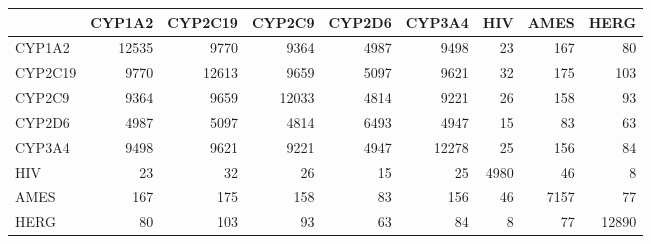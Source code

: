\begin{tabular}{lrrrrrrrr}
\toprule
 & CYP1A2 & CYP2C19 & CYP2C9 & CYP2D6 & CYP3A4 & HIV & AMES & HERG \\
\midrule
CYP1A2 & 12535 & 9770 & 9364 & 4987 & 9498 & 23 & 167 & 80 \\
CYP2C19 & 9770 & 12613 & 9659 & 5097 & 9621 & 32 & 175 & 103 \\
CYP2C9 & 9364 & 9659 & 12033 & 4814 & 9221 & 26 & 158 & 93 \\
CYP2D6 & 4987 & 5097 & 4814 & 6493 & 4947 & 15 & 83 & 63 \\
CYP3A4 & 9498 & 9621 & 9221 & 4947 & 12278 & 25 & 156 & 84 \\
HIV & 23 & 32 & 26 & 15 & 25 & 4980 & 46 & 8 \\
AMES & 167 & 175 & 158 & 83 & 156 & 46 & 7157 & 77 \\
HERG & 80 & 103 & 93 & 63 & 84 & 8 & 77 & 12890 \\
\bottomrule
\end{tabular}
